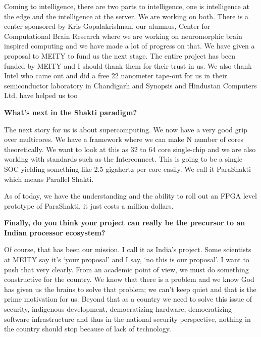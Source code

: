 \begin{multicols}{2}
Coming to intelligence, there are two parts to intelligence, one is intelligence at the edge and the intelligence at the server. We are working on both. There is a center sponsored by Kris Gopalakrishnan, our alumnus, Center for Computational Brain Research where we are working on neuromorphic brain inspired computing and we have made a lot of progress on that. We have given a proposal to MEITY to fund us the next stage. The entire project has been funded by MEITY and I should thank them for their trust in us. We also thank Intel who came out and did a free 22 nanometer tape-out for us in their semiconductor laboratory in Chandigarh and Synopsis and Hindustan Computers Ltd. have helped us too 

\noindent
{\bf What's next in the Shakti paradigm?}

The next story for us is about supercomputing. We now have a very good grip over multicores. We have a framework where we can make N number of cores theoretically. We want to look at this as 32 to 64 core single-chip and we are also working with standards such as the Interconnect. This is going to be a single SOC yielding something like 2.5 gigahertz per core easily. We call it ParaShakti which means Parallel Shakti. 

As of today, we have the understanding and the ability to roll out an FPGA level prototype of ParaShakti, it just costs a million dollars.


\noindent
{\bf Finally, do you think your project can really be the precursor to an Indian processor ecosystem?}


  Of course, that has been our mission. I call it as India's project. Some scientists at MEITY say it's `your proposal' and I say, `no this is our proposal'. I want to push that very clearly. From an academic point of view, we must do something constructive for the country. We know that there is a problem and we know God has given us the brains to solve that problem; we can't keep quiet and that is the prime motivation for us. Beyond that as a country we need to solve this issue of security, indigenous development, democratizing hardware, democratizing software infrastructure and thus in the national security perspective, nothing in the country should stop because of lack of technology.


\end{multicols}
